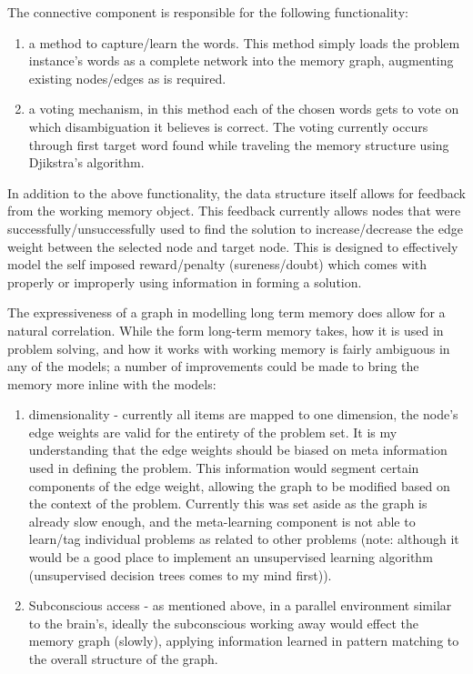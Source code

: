 The connective component is responsible for the following functionality:

\begin{enumerate}
	\item a method to capture/learn the words.  This method simply loads the problem instance's words as a complete network into the memory graph, augmenting existing nodes/edges as is required.
	\item a voting mechanism, in this method each of the chosen words gets to vote on which disambiguation it believes is correct.  The voting currently occurs through first target word found while traveling the memory structure using Djikstra's algorithm.
\end{enumerate}

In addition to the above functionality, the data structure itself allows for feedback from the working memory object.  This feedback currently allows nodes that were successfully/unsuccessfully used to find the solution to increase/decrease the edge weight between the selected node and target node.  This is designed to effectively model the self imposed reward/penalty (sureness/doubt) which comes with properly or improperly using information in forming a solution.

The expressiveness of a graph in modelling long term memory does allow for a natural correlation. While the form long-term memory takes, how it is used in problem solving, and how it works with working memory is fairly ambiguous in any of the models; a number of improvements could be made to bring the memory more inline with the models:

\begin{enumerate}
	\item dimensionality - currently all items are mapped to one dimension, the node's edge weights are valid for the entirety of the problem set.  It is my understanding that the edge weights should be biased on meta information used in defining the problem.  This information would segment certain components of the edge weight, allowing the graph to be modified based on the context of the problem.  Currently this was set aside as the graph is already slow enough, and the meta-learning component is not able to learn/tag individual problems as related to other problems (note: although it would be a good place to implement an unsupervised learning algorithm (unsupervised decision trees comes to my mind first)).
	\item Subconscious access - as mentioned above, in a parallel environment similar to the brain's, ideally the subconscious working away would effect the memory graph (slowly), applying information learned in pattern matching to the overall structure of the graph.
\end{enumerate} 

